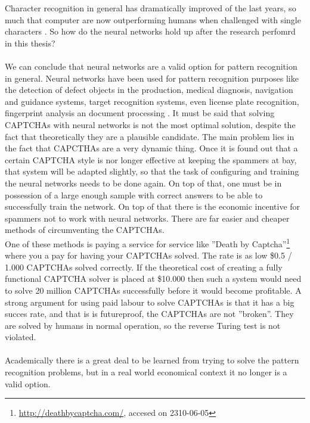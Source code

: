 \documentclass[pdftex,a4paper,12pt,twoside]{report}
\theoremstyle{plain} \newtheorem{theorem}{Theorem} \newtheorem{proposition}{Proposition} \newtheorem{lemma}{Lemma} \newtheorem*{corollary}{Corollary}
\theoremstyle{definition} \newtheorem{definition}{Definition} \newtheorem{conjecture}{Conjecture} \newtheorem*{example}{Example} \newtheorem{algorithm}{Algorithm}
\theoremstyle{remark} \newtheorem*{remark}{Remark} \newtheorem*{note}{Note} \newtheorem{case}{Case}
\begin{document}
Character recognition in general has dramatically improved of the last years, so much that computer are now outperforming humans when challenged with single characters \citep{Chellapilla2005}. So how do the neural networks hold up after the research perfomrd in this thesis?\\\\We can conclude that neural networks are a valid option for pattern recognition in general. Neural networks have been used for pattern recognition purposes like the detection of defect objects in the production, medical diagnosis, navigation and guidance systems, target recognition systems, even license plate recognition, fingerprint analysis an document processing \citep{Egmont-Petersen2002}. It must be said that solving CAPTCHAs with neural networks is not the most optimal solution, despite the fact that theoretically they are a plausible candidate. The main problem lies in the fact that CAPCTHAs are a very dynamic thing. Once it is found out that a certain CAPTCHA style is nor longer effective at keeping the spammers at bay, that system will be adapted slightly, so that the task of configuring and training the neural networks needs to be done again. On top of that, one must be in possession of a large enough sample with correct answers to be able to successfully train the network. On top of that there is the economic incentive for spammers not to work with neural networks. There are far easier and cheaper methods of circumventing the CAPTCHAs.\\One of these methods is paying a service for service like ''Death by Captcha''\footnote{\url{http://deathbycaptcha.com/}, accesed on 2310-06-05} where you a pay for having your CAPTCHAs solved. The rate is as low \$0.5 / 1.000 CAPTCHAs solved correctly. If the theoretical cost of creating a fully functional CAPTCHA solver is placed at \$10.000 then such a system would need to solve 20 million CAPTCHAs successfully before it would become profitable. A strong argument for using paid labour to solve CAPTCHAs is that it has a big succes rate, and that is is futureproof, the CAPTCHAs are not ''broken''. They are solved by humans in normal operation, so the reverse Turing test is not violated.\\\\Academically there is a great deal to be learned from trying to solve the pattern recognition problems, but in a real world economical context it no longer is a valid option.
%
%
\end{document}
